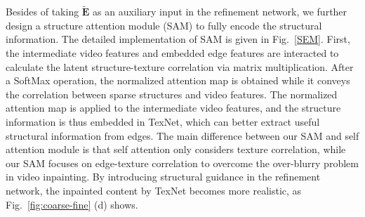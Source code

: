 Besides of taking $\boldsymbol{\widetilde{E}}$ as an auxiliary input in the refinement network, we further design a structure attention module (SAM) to fully encode the structural information.
The detailed implementation of SAM is given in Fig.~\ref{SEM}.
First, the intermediate video features and embedded edge features are interacted to calculate the latent structure-texture correlation via matrix multiplication. 
After a SoftMax operation, the normalized attention map is obtained while it conveys the correlation between sparse structures and video features.
%
The normalized attention map is applied to the intermediate video features, and the structure information is thus embedded in TexNet, which can better extract useful structural information from edges.
{\color{blue}
The main difference between our SAM and self attention module \cite{vaswani2017attention} is that self attention only considers texture correlation, while our SAM focuses on edge-texture correlation to overcome the over-blurry problem in video inpainting.}
By introducing structural guidance in the refinement network, the inpainted content by TexNet becomes more realistic, as Fig.~\ref{fig:coarse-fine} (d) shows.



